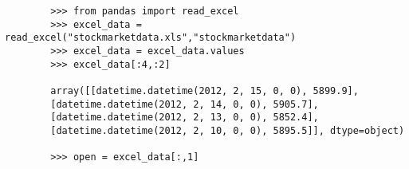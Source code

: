 \documentclass[11pt]{article} %
\begin{document}
	\begin{framed}
		\begin{verbatim}
		>>> from pandas import read_excel
		>>> excel_data = read_excel("stockmarketdata.xls","stockmarketdata")
		>>> excel_data = excel_data.values
		>>> excel_data[:4,:2]
		
		array([[datetime.datetime(2012, 2, 15, 0, 0), 5899.9],
		[datetime.datetime(2012, 2, 14, 0, 0), 5905.7],
		[datetime.datetime(2012, 2, 13, 0, 0), 5852.4],
		[datetime.datetime(2012, 2, 10, 0, 0), 5895.5]], dtype=object)
		
		>>> open = excel_data[:,1]
		\end{verbatim}
	\end{framed}
	
\end{document}
